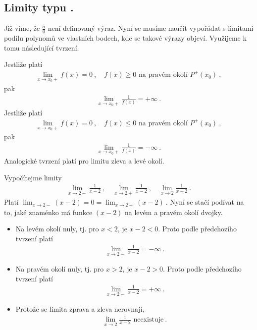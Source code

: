 \subsection*{Limity typu .}

Již víme, že $\frac{a}{0}$ není definovaný výraz. Nyní se musíme naučit vypořádat s limitami podílu polynomů ve vlastních bodech, kde se takové výrazy objeví. Využijeme k tomu následující tvrzení.

Jestliže platí
\begin{align}
    \lim_{x \rightarrow x_0+} f(x) = 0 \:, \quad f(x) \geq 0 \text{ na pravém okolí } P^+(x_0) \:,
\end{align}
pak
\begin{align}
    \lim_{x \rightarrow x_0+} \frac{1}{f(x)} = + \infty \:.
\end{align}
Jestliže platí
\begin{align}
    \lim_{x \rightarrow x_0+} f(x) = 0 \:, \quad f(x) \leq 0 \text{ na pravém okolí } P^+(x_0) \:,
\end{align}
pak
\begin{align}
    \lim_{x \rightarrow x_0+} \frac{1}{f(x)} = - \infty \:.
\end{align}
Analogické tvrzení platí pro limitu zleva a levé okolí.

\begin{example}
    Vypočítejme limity \begin{align}
        \lim_{x \rightarrow 2-} \frac{1}{x-2} \:, \quad \lim_{x \rightarrow 2+} \frac{1}{x-2} \:, \quad \lim_{x \rightarrow 2} \frac{1}{x-2} \:.
    \end{align}
    Platí $\lim_{x \rightarrow 2-} (x-2) = 0 = \lim_{x \rightarrow 2+} (x-2) \:.$
    Nyní se stačí podívat na to, jaké znaménko má funkce $(x-2)$ na levém a pravém okolí dvojky.
    \begin{itemize}
        \item Na levém okolí nuly, tj. pro $x<2$, je $x-2<0$. Proto podle předchozího tvrzení platí \begin{align}
            \lim_{x \rightarrow 2-} \frac{1}{x-2} = - \infty \:.
        \end{align}

        \item Na pravém okolí nuly, tj. pro $x>2$, je $x-2>0$. Proto podle předchozího tvrzení platí \begin{align}
            \lim_{x \rightarrow 2-} \frac{1}{x-2} = + \infty \:.
        \end{align}

        \item Protože se limita zprava a zleva nerovnají,
        \begin{align}
            \lim_{x \rightarrow 2} \frac{1}{x-2} \text{ neexistuje} \:. 
        \end{align}
    \end{itemize}

\end{example}


